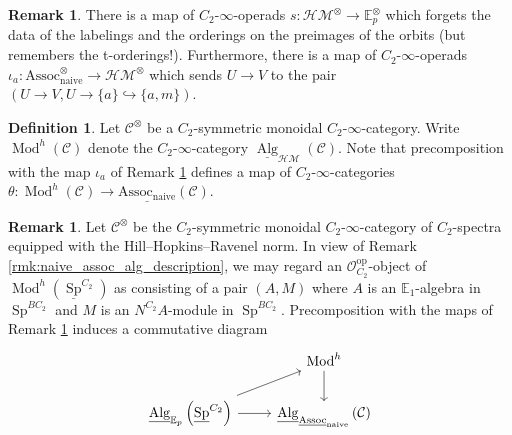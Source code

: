 \documentclass{article}
\DeclareMathOperator{\Alg}{Alg}
\DeclareMathOperator{\Mod}{Mod} %
\DeclareMathOperator{\Spectra}{Sp} %
\newcommand{\EE}{\mathbb{E}}
\newcommand{\op}{\mathrm{op}}
\theoremstyle{definition}
\newtheorem{definition}[equation]{Definition}
\newtheorem{remark}[equation]{Remark}
\begin{document}
\begin{remark}\label{rmk:param_operad_maps}
    There is a map of $ C_2 $-$ \infty $-operads $ s \colon \mathcal{HM}^\otimes \to \mathbb{E}_p^\otimes $ which forgets the data of the labelings and the orderings on the preimages of the orbits (but remembers the t-orderings!).  
    Furthermore, there is a map of $ C_2 $-$ \infty $-operads $ \iota_a \colon \mathrm{Assoc}_{\mathrm{naive}}^\otimes \to \mathcal{HM}^\otimes $ which sends $ U \to V $ to the pair $ (U \to V, U \to\{a\} \hookrightarrow \{a,m\}) $. 
\end{remark}
\begin{definition}\label{defn:genuine_hermitian_modules}
    Let $ \mathcal{C}^\otimes $ be a $ C_2 $-symmetric monoidal $ C_2 $-$ \infty $-category. 
    Write $ \Mod^h(\mathcal{C}) $ denote the $ C_2 $-$ \infty $-category $ \underline{\Alg}_{\mathcal{HM}}(\mathcal{C}) $. 
    Note that precomposition with the map $ \iota_a $ of Remark \ref{rmk:param_operad_maps} defines a map of $ C_2 $-$ \infty $-categories $ \theta \colon \Mod^h(\mathcal{C}) \to \underline{\mathrm{Assoc}_{\mathrm{naive}}}(\mathcal{C}) $. 
\end{definition}
\begin{remark}\label{rmk:from_param_operad_maps_to_alg_mod_maps}
    Let $ \mathcal{C}^\otimes $ be the $ C_2 $-symmetric monoidal $ C_2 $-$ \infty $-category of $ C_2 $-spectra equipped with the Hill--Hopkins--Ravenel norm.  
    In view of Remark \ref{rmk:naive_assoc_alg_description}, we may regard an $ \mathcal{O}^\op_{C_2} $-object of $ \Mod^h\left(\underline{\Spectra}^{C_2}\right) $ as consisting of a pair $ (A,M) $ where $ A $ is an $ \EE_1 $-algebra in $ \Spectra^{BC_2} $ and $ M $ is an $ N^{C_2}A $-module in $ \Spectra^{BC_2} $. 
    Precomposition with the maps of Remark \ref{rmk:param_operad_maps} induces a commutative diagram
    \begin{equation*}
    \begin{tikzcd}
        & \Mod^h \ar[d] \\
        \underline{\Alg}_{\EE_p}\left(\underline{\Spectra}^{C_2}\right) \ar[r] \ar[ru] & \underline{\Alg}_{\underline{\mathrm{Assoc}}_{\mathrm{naive}}}\left(\mathcal{C}\right)          
    \end{tikzcd}     
    \end{equation*} 
\end{remark}
\end{document}
